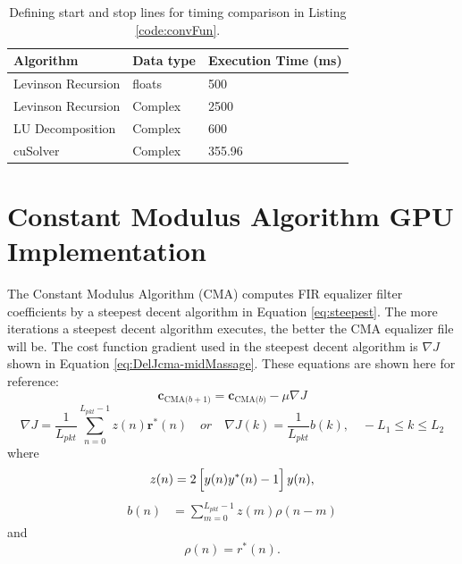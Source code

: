 \begin{table}
\caption{Defining start and stop lines for timing comparison in Listing \ref{code:convFun}.}
\begin{center}
\begin{tabular}{lll}
	\toprule
	Algorithm 			& Data type	& Execution Time (ms)	\\ \midrule
	Levinson Recursion 	& floats 	& 500 					\\
	Levinson Recursion 	& Complex 	& 2500 					\\
	LU Decomposition 	& Complex 	& 600				 	\\
	cuSolver			& Complex	& 355.96				\\
	\bottomrule
\end{tabular}
\end{center}
\label{tab:ZFMMSEtimingComparison}
\end{table}

\clearpage
\section{Constant Modulus Algorithm GPU Implementation}
The Constant Modulus Algorithm (CMA) computes FIR equalizer filter coefficients by a steepest decent algorithm in Equation \eqref{eq:steepest}.
The more iterations a steepest decent algorithm executes, the better the CMA equalizer file will be.
The cost function gradient used in the steepest decent algorithm is $\nabla J$ shown in Equation \eqref{eq:DelJcma-midMassage}.
These equations are shown here for reference:
\begin{equation}
\mathbf{c}_\text{CMA($b+1$)} = \mathbf{c}_\text{CMA($b$)}-\mu \nabla J
\end{equation}
\begin{equation}
	\nabla J = \frac{1}{L_{pkt}} \sum_{n=0}^{L_{pkt}-1}
	z(n)  \mathbf{r}^\ast(n) \quad or \quad \nabla J(k) = \frac{1}{L_{pkt}} b(k), \quad -L_1 \leq k \leq L_2
	\label{eq:CMA_challenge}
\end{equation}
where
\begin{equation}
z(n) = 	2\left[ \vphantom{\displaystyle\sum}  y(n) y^\ast(n) - 1 \right] y(n),
\end{equation} 
\begin{align}
b(n) &= \sum^{L_{pkt}-1}_{m=0} z(m) \rho(n-m)
\end{align}
and
\begin{equation}
\rho(n) = r^\ast(n).
\end{equation}


